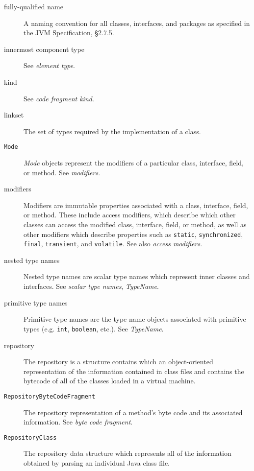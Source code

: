 \documentclass{report}
\begin{document}
\begin{description}
	\item[fully-qualified name] A naming convention for all classes,
	interfaces, and packages as specified in the JVM Specification,
	\S 2.7.5.

	\item[innermost component type] See {\em element type}.

	\item[kind] See {\em code fragment kind}.

	\item[linkset] The set of types required by the implementation
	of a class.

	\item[\texttt{Mode}] {\em Mode} objects represent the modifiers
	of a particular class, interface, field, or method. 
	See {\em modifiers}.

	\item[modifiers] Modifiers are immutable properties associated
	with a class, interface, field, or method. These include
	access modifiers, which describe which other classes can
	access the modified class, interface, field, or method, as well
	as other modifiers which describe properties such as
	\texttt{static}, \texttt{syn\-chron\-ized}, \texttt{final},
	\texttt{transient}, and \texttt{volatile}. 
	See also {\em access modifiers}.

	\item[nested type names] Nested type names are scalar type names
	which represent inner classes and interfaces. See 
	{\em scalar type names}, {\em TypeName}.

	\item[primitive type names] Primitive type names are the type
	name objects associated with primitive types (e.g. \texttt{int},
	\texttt{boolean}, etc.). See {\em TypeName}.

	\item[repository] The repository is a structure contains which an 
	object-oriented representation of the information contained
	in class files and contains the bytecode of all of the classes 
	loaded in a virtual machine.

	\item[\texttt{RepositoryByteCodeFragment}] The repository 
	representation of a method's byte code and its associated information.
	See {\em byte code fragment}.

	\item[\texttt{RepositoryClass}] The repository data structure which 
	represents all of the information obtained by parsing an individual 
	Java class file.


\end{description}
\end{document}
